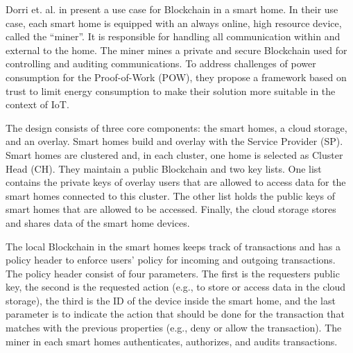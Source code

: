 Dorri et. al. in \cite{Dorri2017SmartHome} present a use case for Blockchain in a smart home. In their use case, each smart home is equipped with an always online, high resource device, called the ``miner''. It is responsible for handling all communication within and external to the home.
The miner mines a private and secure Blockchain used for controlling and auditing communications. To address challenges of power consumption for the Proof-of-Work (POW), they propose a framework based on trust to limit energy consumption to make their solution more suitable in the context of IoT.

The design consists of three core components: the smart homes, a cloud storage, and an overlay.
Smart homes build and overlay with the Service Provider (SP). Smart homes are clustered and, in each cluster, one home is selected as Cluster Head (CH).
They maintain a public Blockchain and two key lists. One list contains the private keys of overlay users that are allowed to access data for the smart homes connected to this cluster.
The other list holds the public keys of smart homes that are allowed to be accessed.
Finally, the cloud storage stores and shares data of the smart home devices.

The local Blockchain in the smart homes keeps track of transactions and has a policy header to enforce users' policy for incoming and outgoing transactions.
The policy header consist of four parameters. The first is the requesters public key, the second is the requested action (e.g., to store or access data in the cloud storage), the third is the ID of the device inside the smart home,
and the last parameter is to indicate the action that should be done for the transaction that matches with the previous properties (e.g., deny or allow the transaction).
The miner in each smart homes authenticates, authorizes, and audits transactions.
